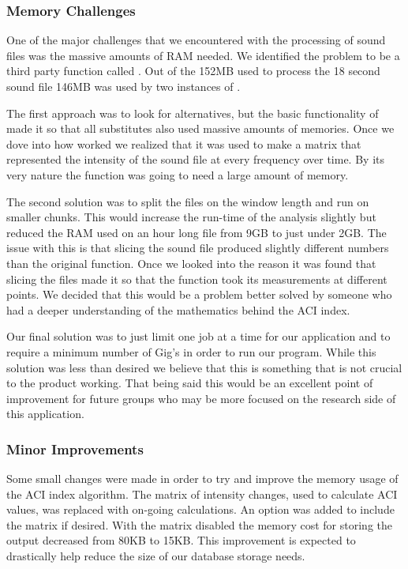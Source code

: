 \subsubsection{Memory Challenges}
One of the major challenges that we encountered with the processing of sound files was the massive amounts of RAM needed. We identified the problem to be a third party function called . Out of the 152MB used to process the 18 second sound file 146MB was used by two instances of .\par
The first approach was to look for alternatives, but the basic functionality of  made it so that all substitutes also used massive amounts of memories. Once we dove into how  worked we realized that it was used to make a matrix that represented the intensity of the sound file at every frequency over time. By its very nature the function was going to need a large amount of memory.\par
The second solution was to split the files on the window length and run  on smaller chunks. This would increase the run-time of the analysis slightly but reduced the RAM used on an hour long file from 9GB to just under 2GB. The issue with this is that slicing the sound file produced slightly different numbers than the original function. Once we looked into the reason it was found that slicing the files made it so that the  function took its measurements at different points. We decided that this would be a problem better solved by someone who had a deeper understanding of the mathematics behind the ACI index.\par
Our final solution was to just limit one job at a time for our application and to require a minimum number of Gig's in order to run our program. While this solution was less than desired we believe that this is something that is not crucial to the product working. That being said this would be an excellent point of improvement for future groups who may be more focused on the research side of this application.\par
\subsubsection{Minor Improvements}
Some small changes were made in order to try and improve the memory usage of the ACI index algorithm. The matrix of intensity changes, used to calculate ACI values, was replaced with on-going calculations. An option was added to include the matrix if desired. With the matrix disabled the memory cost for storing the output decreased from 80KB to 15KB. This improvement is expected to drastically help reduce the size of our database storage needs.